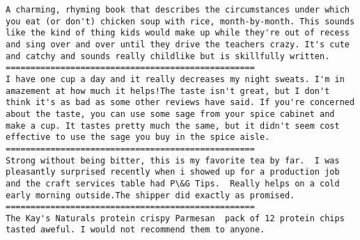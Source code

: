 \documentclass[11pt]{article}
\begin{document}
    \begin{Verbatim}[commandchars=\\\{\}]
A charming, rhyming book that describes the circumstances under which you eat (or don't) chicken soup with rice, month-by-month. This sounds like the kind of thing kids would make up while they're out of recess and sing over and over until they drive the teachers crazy. It's cute and catchy and sounds really childlike but is skillfully written.
==================================================
I have one cup a day and it really decreases my night sweats. I'm in amazement at how much it helps!The taste isn't great, but I don't think it's as bad as some other reviews have said. If you're concerned about the taste, you can use some sage from your spice cabinet and make a cup. It tastes pretty much the same, but it didn't seem cost effective to use the sage you buy in the spice aisle.
==================================================
Strong without being bitter, this is my favorite tea by far.  I was pleasantly surprised recently when i showed up for a production job and the craft services table had P\&G Tips.  Really helps on a cold early morning outside.The shipper did exactly as promised.
==================================================
The Kay's Naturals protein crispy Parmesan  pack of 12 protein chips tasted aweful. I would not recommend them to anyone.

    \end{Verbatim}
\end{document}
